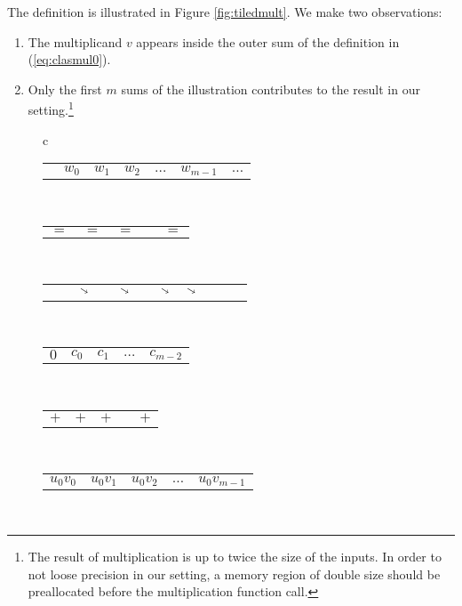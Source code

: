The definition is illustrated in Figure \ref{fig:tiledmult}. We make two
observations:
\begin{enumerate}[label=--]
\item The multiplicand $v$ appears inside the outer sum of the definition in
  (\ref{eq:clasmul0}).
\item Only the first $m$ sums of the illustration contributes to the result in
  our setting.\footnote{The result of multiplication is up to twice the size of
    the inputs. In order to not loose precision in our setting, a memory region
    of double size should be preallocated before the multiplication function
    call.}
\end{enumerate}

\begin{figure}
  \centering
  \footnotesize
  \begin{tabular}{c}
    \begin{tabular}{C{0cm}|C{0.8cm}|C{0.8cm}|C{0.8cm}|C{0.5cm}|C{0.8cm}|C{0cm}}
      & $w_0$ & $w_1$ & $w_2$ & $\ldots$ & $w_{m-1}$ & $\ldots$\\
    \end{tabular}\\
    \begin{tabular}{C{0.8cm}C{0.8cm}C{0.8cm}C{0.5cm}C{0.8cm}}
      $=$ & $=$ & $=$ &  & $=$
    \end{tabular}\\[-2ex]
    \begin{tabular}{C{0.2cm}C{0.2cm}C{0.2cm}C{0.2cm}C{0.2cm}C{0cm}C{0.7cm}C{0.2cm}C{0.2cm}C{0.2cm}C{0.2cm}}
      & & $\diagonalarrowdown$ & & $\diagonalarrowdown$ & & $\diagonalarrowdown$ & $\diagonalarrowdown$ & &
    \end{tabular}\\[-1.4ex]
    \begin{tabular}{C{0.8cm}C{0.8cm}C{0.8cm}C{0.5cm}C{0.8cm}}
      $0$ & $c_0$ & $c_1$ & $\ldots$ & $c_{m-2}$
    \end{tabular}\\[-0.5ex]
    \begin{tabular}{C{0.8cm}C{0.8cm}C{0.8cm}C{0.5cm}C{0.8cm}}
      $+$ & $+$ & $+$ &  & $+$
    \end{tabular}\\[-0.5ex]
    \begin{tabular}{C{0.8cm}C{0.8cm}C{0.8cm}C{0.5cm}C{0.8cm}}
      $u_0 v_0$ & $u_0 v_1$ & $u_0 v_2$ & $\ldots$ & $u_0v_{m-1}$
    \end{tabular}\\[-0.5ex]

\end{tabular}
\end{figure}

